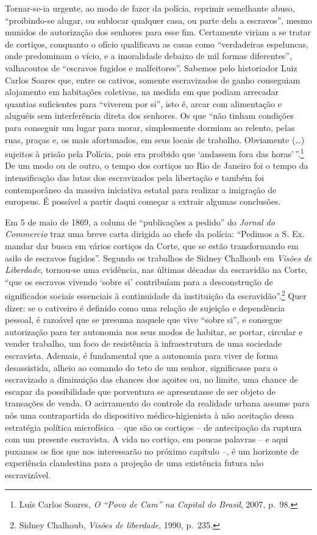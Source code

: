 Tornar-se-ia urgente, ao modo de fazer da polícia, reprimir semelhante
abuso, ``proibindo-se alugar, ou sublocar qualquer casa, ou parte dela a
escravos'', mesmo munidos de autorização dos senhores para esse fim.
Certamente viriam a se tratar de cortiços, conquanto o ofício
qualificava as casas como ``verdadeiras espeluncas, onde predominam o
vício, e a imoralidade debaixo de mil formas diferentes'', valhacoutos
de ``escravos fugidos e malfeitores''. Sabemos pelo historiador Luiz
Carlos Soares que, entre os cativos, somente escravizados de ganho
conseguiam alojamento em habitações coletivas, na medida em que podiam
arrecadar quantias suficientes para ``viverem por si'', isto é, arcar
com alimentação e aluguéis sem interferência direta dos senhores. Os que
``não tinham condições para conseguir um lugar para morar, simplesmente
dormiam ao relento, pelas ruas, praças e, os mais afortunados, em seus
locais de trabalho. Obviamente (\ldots{}) sujeitos à prisão pela
Polícia, pois era proibido que `andassem fora das horas'\,''.\footnote{Luís
  Carlos Soares, \emph{O ``Povo de Cam'' na Capital do Brasil}, 2007,
  p.~98.} De um modo ou de outro, o tempo dos cortiços no Rio de Janeiro
foi o tempo da intensificação das lutas dos escravizados pela libertação
e também foi contemporâneo da massiva iniciativa estatal para realizar a
imigração de europeus. É possível a partir daqui começar a extrair
algumas conclusões.

Em 5 de maio de 1869, a coluna de ``publicações a pedido'' do
\emph{Jornal do Commercio} traz uma breve carta dirigida ao chefe da
polícia: ``Pedimos a S. Ex. mandar dar busca em vários cortiços da
Corte, que se estão transformando em asilo de escravos fugidos''.
Segundo os trabalhos de Sidney Chalhoub em \emph{Visões de Liberdade},
tornou-se uma evidência, nas últimas décadas da escravidão na Corte,
``que os escravos vivendo `sobre si' contribuíam para a desconstrução de
significados sociais essenciais à continuidade da instituição da
escravidão''.\footnote{Sidney Chalhoub, \emph{Visões de liberdade},
  1990, p.~235.} Quer dizer: se o cativeiro é definido como uma relação
de sujeição e dependência pessoal, é razoável que se presuma naquele que
vive ``sobre si'', e consegue autorização para ter autonomia nos seus
modos de habitar, se portar, circular e vender trabalho, um foco de
resistência à infraestrutura de uma sociedade escravista. Ademais, é
fundamental que a autonomia para viver de forma desassistida, alheio ao
comando do teto de um senhor, significasse para o escravizado a
diminuição das chances dos açoites ou, no limite, uma chance de escapar
da possibilidade que porventura se apresentasse de ser objeto de
transações de venda. O acirramento do controle da realidade urbana
assume para nós uma contrapartida do dispositivo médico-higienista à não
aceitação dessa estratégia política microfísica -- que são os cortiços
-- de antecipação da ruptura com um presente escravista. A vida no
cortiço, em poucas palavras -- e aqui puxamos os fios que nos
interessarão no próximo capítulo --, é um horizonte de experiência
clandestina para a projeção de uma existência futura não escravizável.

